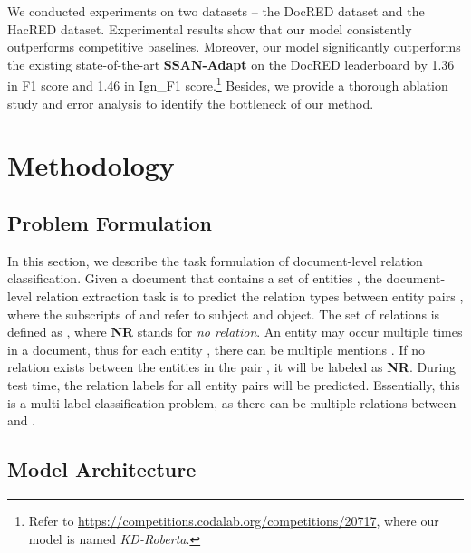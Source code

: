 \documentclass[11pt]{article}
\begin{document}
We conducted experiments on two datasets -- the DocRED \citep{yao2019docred} dataset and the HacRED \citep{cheng-etal-2021-hacred} dataset. Experimental results show that our model consistently outperforms competitive baselines. Moreover, our model significantly outperforms the existing state-of-the-art \textbf{SSAN-Adapt} \citep{xu2021entity} on the DocRED leaderboard by 1.36 in F1 score and 1.46 in Ign\_F1 score.\footnote{Refer to {\url{https://competitions.codalab.org/competitions/20717}}, where our model is named \textit{KD-Roberta}.} Besides, we provide a thorough ablation study and error analysis to identify the bottleneck of our method. 







\section{Methodology}
\subsection{Problem Formulation}
In this section, we describe the task formulation of document-level relation classification. Given a document  that contains a set of entities , the document-level relation extraction task is to predict the relation types between entity pairs , where the subscripts of  and  refer to subject and object. The set of relations is defined as , where \textbf{NR} stands for \textit{no relation}. An entity may occur multiple times in a document, thus for each entity , there can be multiple mentions . If no relation exists between the entities in the pair , it will be labeled as \textbf{NR}. During test time, the relation labels for all entity pairs  will be predicted. Essentially, this is a multi-label classification problem, as there can be multiple relations between  and .








\subsection{Model Architecture}
\end{document}

